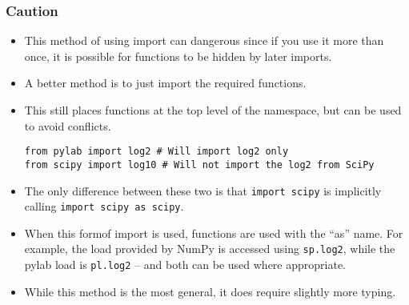 \documentclass[Pydata.tex]{subfiles}
\begin{document}
\subsubsection*{Caution}
\begin{itemize}
 
\item This method of using import can dangerous since if you use it more than once,
it is possible for functions to be hidden by later imports. 
\item A better method is to just import the required
functions. 
\item This still places functions at the top level of the namespace, but can be used to avoid conflicts.
\begin{framed}
\begin{verbatim}
from pylab import log2 # Will import log2 only
from scipy import log10 # Will not import the log2 from SciPy
\end{verbatim}
\end{framed}
\item The only difference between these two is that \texttt{import scipy} is implicitly calling \texttt{import scipy as scipy}.
\item When this formof import is used, functions are used with the “as” name. For example, the load provided
by NumPy is accessed using \texttt{sp.log2}, while the pylab load is \texttt{pl.log2} – and both can be used where appropriate.
\item While this method is the most general, it does require slightly more typing.
\end{itemize}
\end{document}
